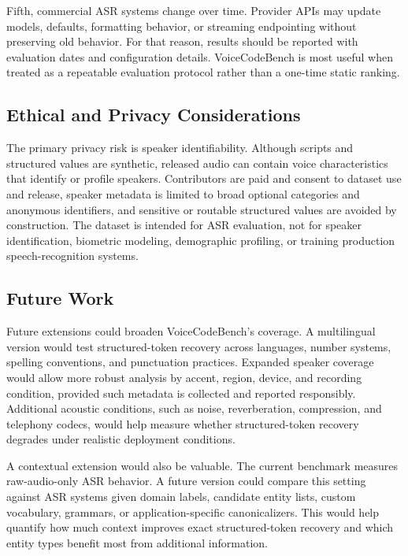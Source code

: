 \documentclass[10pt,twocolumn]{article}
\begin{document}
Fifth, commercial ASR systems change over time. Provider APIs may update
models, defaults, formatting behavior, or streaming endpointing without
preserving old behavior. For that reason, results should be reported
with evaluation dates and configuration details. VoiceCodeBench is
most useful when treated as a repeatable evaluation protocol rather than
a one-time static ranking.

\subsection{Ethical and Privacy
	Considerations}\label{ethical-and-privacy-considerations}

The primary privacy risk is speaker identifiability. Although scripts
and structured values are synthetic, released audio can contain voice
characteristics that identify or profile speakers. Contributors are paid
and consent to dataset use and release, speaker metadata is limited to
broad optional categories and anonymous identifiers, and sensitive or
routable structured values are avoided by construction. The dataset is
intended for ASR evaluation, not for speaker identification, biometric
modeling, demographic profiling, or training production
speech-recognition systems.

\subsection{Future Work}\label{future-work}

Future extensions could broaden VoiceCodeBench's coverage. A
multilingual version would test structured-token recovery across
languages, number systems, spelling conventions, and punctuation
practices. Expanded speaker coverage would allow more robust analysis by
accent, region, device, and recording condition, provided such metadata
is collected and reported responsibly. Additional acoustic conditions,
such as noise, reverberation, compression, and telephony codecs, would
help measure whether structured-token recovery degrades under realistic
deployment conditions.

A contextual extension would also be valuable. The current benchmark
measures raw-audio-only ASR behavior. A future version could compare
this setting against ASR systems given domain labels, candidate entity
lists, custom vocabulary, grammars, or application-specific
canonicalizers. This would help quantify how much context improves exact
structured-token recovery and which entity types benefit most from
additional information.
\end{document}
